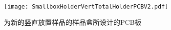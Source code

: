                   


\begin{figure}[h]
  \centering%
  \texttt{[image: SmallboxHolderVertTotalHolderPCBV2.pdf]}
  \caption{为新的竖直放置样品的样品盒所设计的PCB板}
  \label{fig:SmallboxHolderVertTotalHolderPCBV2}
\end{figure}










